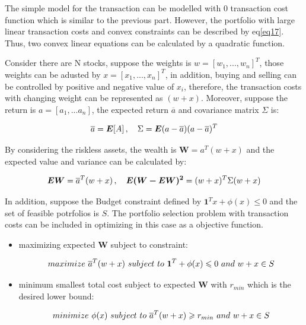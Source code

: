 \documentclass[sigconf]{acmart}
\begin{document}
The simple model for the transaction can be modelled with 0 transaction cost function which is similar to the previous part. However, the portfolio with large linear transaction costs and convex constraints can be described by eq\eqref{eq17}. Thus, two convex linear equations can be calculated by a quadratic function. 

Consider there are N stocks, suppose the weights is $w=[w_{1},...,w_{n}]^{T}$, those weights can be adusted by $x=[x_{1},...,x_{n}]^{T}$, in addition, buying and selling can be controlled by positive and negative value of $x_{i}$, therefore, the transaction costs with changing weight can be represented as $(w+x)$. Moreover, suppose the return is $a=[a_{1},...a_{n}]$, the expected return $\overline{a}$ and covariance matrix $\Sigma$ is:

\begin{equation} \label{eq18}
\setlength{\abovedisplayskip}{3pt}
\setlength{\belowdisplayskip}{3pt}
\overline{a}=\bm{E}[A]\, , \quad \Sigma=\bm{E}(a-\overline{a})(a-\overline{a})^{T}
\end{equation}

By considering the riskless assets, the wealth is $\bm{W}=a^{T}(w+x)$ and the expected value and variance can be calculated by:

\begin{equation} \label{eq19}
\setlength{\abovedisplayskip}{3pt}
\setlength{\belowdisplayskip}{3pt}
\bm{EW}=\overline{a}^{T}(w+x)\, , \quad \bm{E(W-EW)^{2}}=(w+x)^{T}\Sigma(w+x)
\end{equation}

In addition, suppose the Budget constraint defined by $\bm{1}^{T}x+\phi(x)\leqslant0$ and the set of feasible potrfolios is $S$. The portfolio selection problem with transaction costs can be included in optimizing in this case as a objective function.

\begin{itemize}
\item maximizing expected \textbf{W} subject to constraint:

\begin{equation} \label{eq20}
\setlength{\abovedisplayskip}{3pt}
\setlength{\belowdisplayskip}{9pt}
maximize\ \overline{a}^{T}(w+x)\ subject\ to\ \bm{1}^{T} + \phi(x) \leqslant 0 \ and\ w+x \in S
\end{equation}

\item minimum smallest total cost subject to expected \textbf{W} with $r_{min}$ which is the desired lower bound:

\begin{equation} \label{eq21}
\setlength{\abovedisplayskip}{3pt}
\setlength{\belowdisplayskip}{9pt}
minimize\ \phi{(x)}\ subject\ to\ \overline{a}^{T}(w+x)\geqslant r_{min} \ and\ w+x \in S
\end{equation}

\end{itemize}
\end{document}
